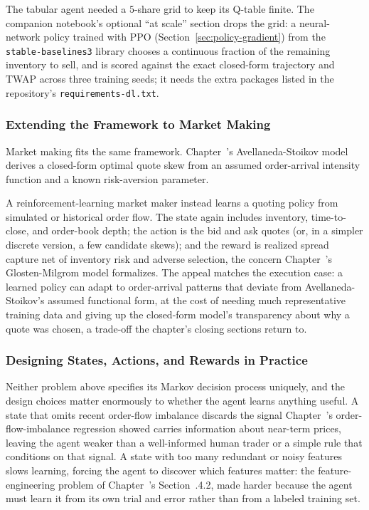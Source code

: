 \documentclass[../ai_in_finance]{subfiles}
\begin{document}
The tabular agent needed a $5$-share grid to keep its Q-table finite. The companion notebook's optional ``at scale'' section drops the grid: a neural-network policy trained with PPO (Section~\ref{sec:policy-gradient}) from the \texttt{stable-baselines3} library chooses a continuous fraction of the remaining inventory to sell, and is scored against the exact closed-form trajectory and TWAP across three training seeds; it needs the extra packages listed in the repository's \texttt{requirements-dl.txt}.

\subsubsection*{Extending the Framework to Market Making}

Market making fits the same framework. Chapter~'s Avellaneda-Stoikov model derives a closed-form optimal quote skew from an assumed order-arrival intensity function and a known risk-aversion parameter.

A reinforcement-learning market maker instead learns a quoting policy from simulated or historical order flow. The state again includes inventory, time-to-close, and order-book depth; the action is the bid and ask quotes (or, in a simpler discrete version, a few candidate skews); and the reward is realized spread capture net of inventory risk and adverse selection, the concern Chapter~'s Glosten-Milgrom model formalizes. The appeal matches the execution case: a learned policy can adapt to order-arrival patterns that deviate from Avellaneda-Stoikov's assumed functional form, at the cost of needing much representative training data and giving up the closed-form model's transparency about why a quote was chosen, a trade-off the chapter's closing sections return to.

\subsubsection*{Designing States, Actions, and Rewards in Practice}

Neither problem above specifies its Markov decision process uniquely, and the design choices matter enormously to whether the agent learns anything useful. A state that omits recent order-flow imbalance discards the signal Chapter~'s order-flow-imbalance regression showed carries information about near-term prices, leaving the agent weaker than a well-informed human trader or a simple rule that conditions on that signal. A state with too many redundant or noisy features slows learning, forcing the agent to discover which features matter: the feature-engineering problem of Chapter~'s Section~.4.2, made harder because the agent must learn it from its own trial and error rather than from a labeled training set.
\end{document}

